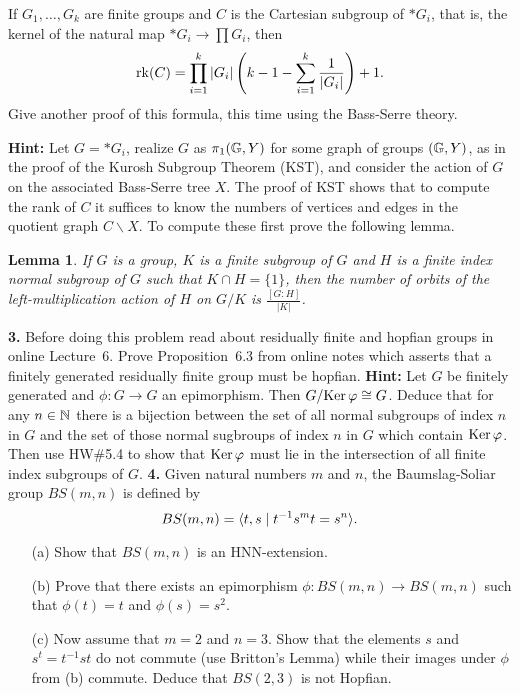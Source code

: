\documentclass[12pt]{amsart}
\newtheorem* {Lemma}    {Lemma}
\begin{document}
If $G_1,\ldots, G_k$ are finite groups and $C$ is the Cartesian subgroup of $\ast G_i$, that is, the
kernel of the natural map $\ast G_i\to \prod G_i$, then
$${\rm rk}(C)=\prod_{i=1}^k |G_i| \left(k-1-\sum_{i=1}^k\frac{1}{|G_i|}\right)+1.$$
Give another proof of this formula, this time using the Bass-Serre theory.

{\bf Hint:} Let $G=\ast G_i$, realize $G$ as $\pi_1({\mathbb G}, Y)$
for some graph of groups $({\mathbb G},Y)$, as in the proof of the Kurosh Subgroup Theorem (KST), and consider the action of $G$ on the associated
Bass-Serre tree $X$. The proof of KST shows that to compute the rank of
$C$ it suffices to know the numbers of vertices and edges in the quotient
graph $C\backslash X$. To compute these first prove the following lemma.

\begin{Lemma} If $G$ is a group, $K$ is a finite subgroup of $G$ and
$H$ is a finite index normal subgroup of $G$ such that $K\cap H=\{1\}$, then the number of orbits of the left-multiplication action of $H$ on $G/K$ is $\frac{[G:H]}{|K|}$.
\end{Lemma}

\skv
{\bf 3.} Before doing this problem read about residually finite and hopfian groups in online Lecture~6. Prove Proposition~6.3 from online
notes which asserts that a finitely generated residually finite group
must be hopfian. {\bf Hint:} Let $G$ be finitely generated and $\phi:G\to G$ an epimorphism. Then $G/{\rm Ker\,}{\varphi}\cong G$. Deduce that for any $n\in{\mathbb N}$ 
there is a bijection between the set of all normal subgroups of index $n$ in $G$ 
and the set of those normal sugbroups of index $n$ in $G$ which contain ${\rm Ker\,}{\varphi}$. 
Then use HW\#5.4 to show that ${\rm Ker\,}{\varphi}$ must lie in the intersection of all
finite index subgroups of $G$.
\skv
{\bf 4.} Given natural numbers $m$ and $n$, the Baumslag-Soliar group
$BS(m,n)$ is defined by
$$BS(m,n)={\langle} t,s \mid t^{-1}s^mt=s^n{\rangle}.$$
\begin{itemize}
\item[(a)] Show that $BS(m,n)$ is an HNN-extension. 
\item[(b)] Prove that there exists an epimorphism
$\phi:BS(m,n)\to BS(m,n)$ such that $\phi(t)=t$ and $\phi(s)=s^2$.
\item[(c)] Now assume that $m=2$ and $n=3$. Show that
the elements $s$ and $s^t=t^{-1}st$ do not commute (use Britton's Lemma)
while their images under $\phi$ from (b) commute. Deduce that
$BS(2,3)$ is not Hopfian.
\end{itemize}
\end{document}
